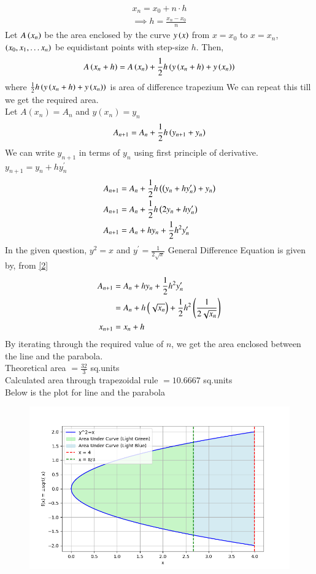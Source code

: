 \documentclass[journal]{IEEEtran}
\begin{document}
\begin{align}
    x_n=x_0+n\cdot h\\
    \implies h=\frac{x_n-x_0}{n}
\end{align}
Let $A\left(x_n\right)$ be the area enclosed by the curve $y\left(x\right)$ from $x=x_0$ to $x=x_n$, $\left(x_0, x_1, \dots x_n\right)$ be equidistant points with step-size $h$. Then,
\begin{align}
  A\left(x_n+h\right)=A\left(x_n\right)+\frac{1}{2}h\left(y\left(x_n+h\right)+y\left(x_n\right)\right)
\end{align}
where $\frac{1}{2}h\left(y\left(x_n+h\right)+y\left(x_n\right)\right)$ is area of difference trapezium
We can repeat this till we get the required area.\\
Let $A(x_n)=A_n$ and $y(x_n)=y_n$
\begin{align}
        A_{n+1}=A_n+\frac{1}{2}h\left(y_{n+1}+y_n\right)
\end{align}
We can write $y_{n+1}$ in terms of $y_n$ using first principle of derivative. $y_{n+1}=y_n+hy^{\prime}_n$
\begin{align}
  A_{n+1}&=A_n+\frac{1}{2}h\left(\left(y_{n}+hy^{\prime}_n\right)+y_n\right)\\
  A_{n+1}&=A_n+\frac{1}{2}h\left(2y_n+hy^{\prime}_n\right)\\
  A_{n+1}&=A_n+hy_n+\frac{1}{2}h^2y^{\prime}_n\label{2}\\
\end{align}
In the given question, $y^2=x$ and $y^{\prime}=\frac{1}{2\sqrt{x}}$\newline
General Difference Equation is given by, from \ref{2}
\begin{align}
  A_{n+1}&=A_n+hy_n+\frac{1}{2}h^2y^{\prime}_n\\
  &=A_n+h\left(\sqrt{x_n}\right)+\frac{1}{2}h^2\left(\frac{1}{2\sqrt{x_n}}\right)\\
  x_{n+1}&=x_n+h
\end{align}
By iterating through the required value of $n$, we get the area enclosed between the line and the parabola.\\
Theoretical area $= \frac{32}{3}$ sq.units\\
Calculated area through trapezoidal rule $=10.6667$ sq.units\\

Below is the plot for line and the parabola
\begin{figure}[h!]
	\centering
	\includegraphics[width=1\columnwidth]{figs/fig.png}
	\label{stemplot}
\end{figure}
\end{document}
